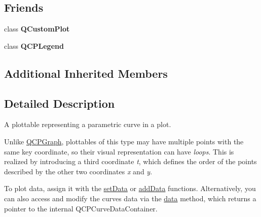 \subsection*{Friends}
\begin{DoxyCompactItemize}
\item 
\mbox{\label{classQCPCurve_a1cdf9df76adcfae45261690aa0ca2198}} 
class {\bfseries Q\+Custom\+Plot}
\item 
\mbox{\label{classQCPCurve_a8429035e7adfbd7f05805a6530ad5e3b}} 
class {\bfseries Q\+C\+P\+Legend}
\end{DoxyCompactItemize}
\subsection*{Additional Inherited Members}


\subsection{Detailed Description}
A plottable representing a parametric curve in a plot. 



Unlike \hyperlink{classQCPGraph}{Q\+C\+P\+Graph}, plottables of this type may have multiple points with the same key coordinate, so their visual representation can have {\itshape loops}. This is realized by introducing a third coordinate {\itshape t}, which defines the order of the points described by the other two coordinates {\itshape x} and {\itshape y}.

To plot data, assign it with the \hyperlink{classQCPCurve_a41246850d2e080bc57183ca19cd4135e}{set\+Data} or \hyperlink{classQCPCurve_a73edf394b94f3f24f07518e30565a07f}{add\+Data} functions. Alternatively, you can also access and modify the curve\textquotesingle{}s data via the \hyperlink{classQCPCurve_a761492fd00b1ab7cb18ce23c118c6c60}{data} method, which returns a pointer to the internal Q\+C\+P\+Curve\+Data\+Container.

